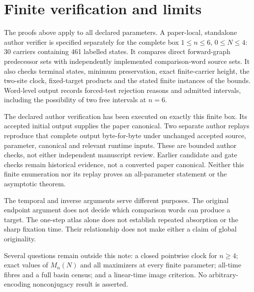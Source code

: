 \section{Finite verification and limits}\label{sec:verification}
The proofs above apply to all declared parameters. A paper-local,
standalone author verifier is specified separately for the complete box
$1\le n\le6$, $0\le N\le4$: 30 carriers containing 461 labelled states.
It compares direct forward-graph predecessor sets with independently
implemented comparison-word source sets. It also checks terminal states,
minimum preservation, exact finite-carrier height, the two-site clock,
fixed-target products and the stated finite instances of the bounds.
Word-level output records forced-test rejection reasons and admitted
intervals, including the possibility of two free intervals at $n=6$.

The declared author verification has been executed on exactly this finite
box. Its accepted initial output supplies the paper canonical. Two separate
author replays reproduce that complete output byte-for-byte under unchanged
accepted source, parameter, canonical and relevant runtime inputs. These
are bounded author checks, not either independent manuscript review.
Earlier candidate and gate checks remain historical evidence, not a
converted paper canonical. Neither this finite enumeration nor its replay
proves an all-parameter statement or the asymptotic theorem.

The temporal and inverse arguments serve different purposes. The original
endpoint argument does not decide which comparison words can produce a
target. The one-step atlas alone does not establish repeated absorption
or the sharp fixation time. Their relationship does not make either a
claim of global originality.

Several questions remain outside this note: a closed pointwise clock for
$n\ge4$; exact values of $M_n(N)$ and all maximizers at every finite
parameter; all-time fibres and a full basin census; and a linear-time
image criterion. No arbitrary-encoding nonconjugacy result is asserted.

